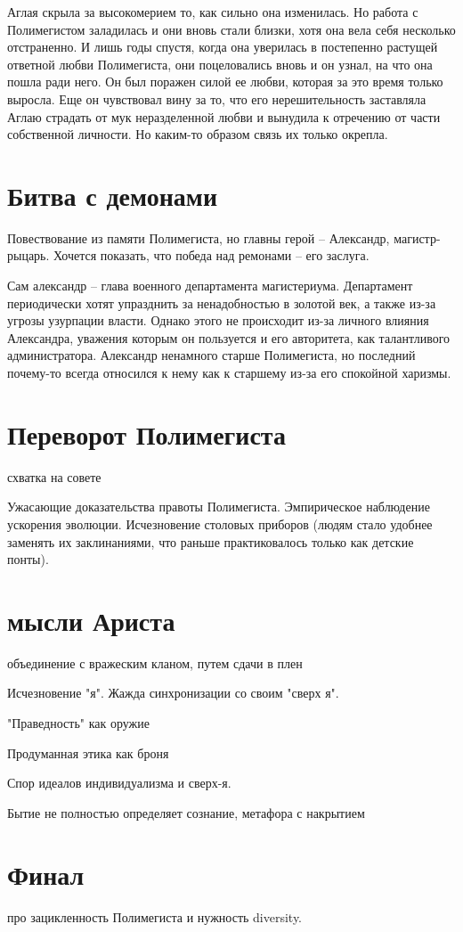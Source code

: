 \documentclass[12pt,a4paper]{article}
\begin{document}
Аглая скрыла за высокомерием то, как сильно она изменилась. Но работа с Полимегистом заладилась и они вновь стали близки, хотя она вела себя несколько отстраненно. И лишь годы спустя, когда она уверилась в постепенно растущей ответной любви Полимегиста, они поцеловались вновь и он узнал, на что она пошла ради него. Он был поражен силой ее любви, которая за это время только выросла. Еще он чувствовал вину за то, что его нерешительность заставляла Аглаю страдать от мук неразделенной любви и вынудила к отречению от части собственной личности. Но каким-то образом связь их только окрепла.

\section*{Битва с демонами}
Повествование из памяти Полимегиста, но главны герой -- Александр, магистр-рыцарь. Хочется показать, что победа над ремонами -- его заслуга.

Сам александр -- глава военного департамента магистериума. Департамент периодически хотят упразднить за ненадобностью в золотой век, а также из-за угрозы узурпации власти. Однако этого не происходит из-за личного влияния Александра, уважения которым он пользуется и его авторитета, как талантливого администратора. Александр ненамного старше Полимегиста, но последний почему-то всегда относился к нему как к старшему из-за его спокойной харизмы.


\section*{Переворот Полимегиста}
схватка на совете

Ужасающие доказательства правоты Полимегиста.
Эмпирическое наблюдение ускорения эволюции.
Исчезновение столовых приборов (людям стало удобнее заменять их заклинаниями, что раньше практиковалось только как детские понты).

\section*{мысли Ариста}

объединение с вражеским кланом, путем сдачи в плен

Исчезновение "я". Жажда синхронизации со своим "сверх я".

"Праведность" как оружие

Продуманная этика как броня

Спор идеалов индивидуализма и сверх-я. 

Бытие не полностью определяет сознание, метафора с накрытием

\section*{Финал}

про зацикленность Полимегиста и нужность diversity.
\end{document}
